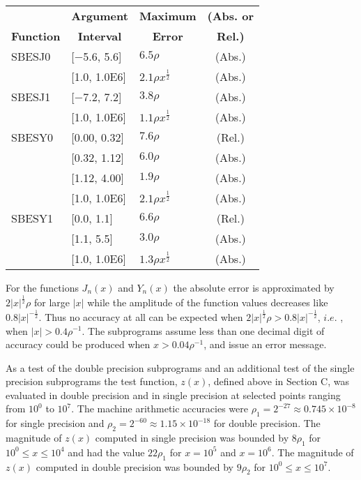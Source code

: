 \documentclass[twoside]{MATH77}
\begin{document}
\begin{tabular}{lllc}
 &\multicolumn{1}{c}{\bf Argument} & \multicolumn{1}{c}{\bf Maximum} &
\multicolumn {1}{c}{\bf (Abs. or}\\
\multicolumn{1}{c}{\bf Function}  &\multicolumn{1}{c}{\bf Interval} &
\multicolumn{1}{c}{\bf Error} & \multicolumn{1}{c}{\bf Rel.)}\\
SBESJ0 & [$-$5.6, 5.6] & \hspace{10pt} $6.5\rho $ & (Abs.)\\
 & [1.0, 1.0E6] & \hspace{10pt} $2.1\rho x^{\frac{1}{2}}$ & (Abs.)\\
SBESJ1 & [$-$7.2, 7.2] & \hspace{10pt} $3.8\rho $ & (Abs.)\\
 & [1.0, 1.0E6] & \hspace{10pt} $1.1\rho x^{\frac{1}{2}}$ & (Abs.)\\
SBESY0 & [0.00, 0.32] & \hspace{10pt} $7.6\rho $ & (Rel.)\\
 & [0.32, 1.12] & \hspace{10pt} $6.0\rho $ & (Abs.)\\
 & [1.12, 4.00] & \hspace{10pt} $1.9\rho $ & (Abs.)\\
 & [1.0, 1.0E6] & \hspace{10pt} $2.1\rho x^{\frac{1}{2}}$ & (Abs.)\\
SBESY1 & [0.0, 1.1] & \hspace{10pt} $6.6\rho $ & (Rel.)\\
 & [1.1, 5.5] & \hspace{10pt} $3.0\rho $ & (Abs.)\\
 & [1.0, 1.0E6] & \hspace{10pt} $1.3\rho x^{\frac{1}{2}}$ & (Abs.)
\end{tabular}

For the functions $J_n(x)$ and $Y_n(x)$ the absolute error is approximated
by $2|x|^{\frac{1}{2}}\rho $ for large $|x|$ while the amplitude of the
function values decreases like $0.8|x|^{-\frac{1}{2}}$. Thus no accuracy at
all can be expected when $2|x|^{\frac{1}{2}}\rho > 0.8|x|^{-\frac{1}{2}}$, $i.e.$%
, when $|x| > 0.4\rho ^{-1}$. The subprograms assume less than one decimal
digit of accuracy could be produced when $x > 0.04\rho ^{-1}$, and issue an
error message.

As a test of the double precision subprograms and an additional test of
the single precision
subprograms the test function, $z(x)$, defined above in Section C, was
evaluated in double precision and in single precision at selected points
ranging from $10^0$ to $10^7$. The machine arithmetic accuracies were $%
\rho_1 = 2^{-27} \approx 0.745\times 10^{-8}$ for single precision
and $\rho _2 = 2^{-60} \approx 1.15\times 10^{- 18}$ for double precision.
The magnitude of $z(x)$ computed in single precision was bounded
by $8\rho _1$ for $10^0 \leq x \leq 10^4$ and had the value
$22\rho _1$ for $x = 10^5$ and $x = 10^6$. The magnitude of $z(x)$ computed
in double precision was bounded by $9\rho _2$ for $10^0 \leq x \leq 10^7.$
\end{document}
